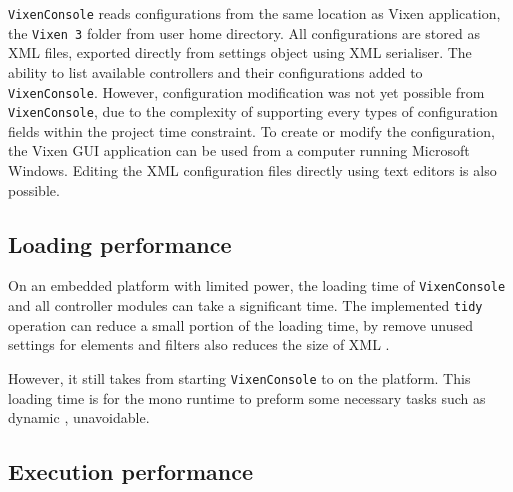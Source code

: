\texttt{VixenConsole} reads configurations from the same location as Vixen application, the \texttt{Vixen 3} folder from user home directory. All configurations are stored as XML files, exported directly from settings object using XML serialiser. The ability to list available controllers and their configurations  added to \texttt{VixenConsole}. However, configuration modification was not yet possible from \texttt{VixenConsole}, due to the complexity of supporting every  types of configuration fields within the project time constraint. To create or modify the configuration, the Vixen GUI application can be used from a computer running Microsoft Windows. Editing the XML configuration files directly using text editors is also possible.


\subsection{Loading performance}

On an embedded platform with limited  power, the loading time of \texttt{VixenConsole} and all controller modules can take a significant time. The implemented \texttt{tidy} operation can reduce a small portion of the loading time, by remove unused settings for elements and filters also reduces the size of XML .

However, it still takes  from starting \texttt{VixenConsole} to  on the  platform. This loading time is for the mono runtime to preform some necessary tasks such as dynamic ,  unavoidable.

\subsection{Execution performance}

